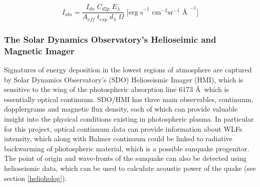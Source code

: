 \begin{equation}\label{irisradiometriccal}
I_{abs} = \frac{{I_{dn}} \; {C_{d2p}} \; {E_{\lambda}}}{{A_{eff}} \; {t_{exp}} \; {d_{\lambda}} \; {\Omega}} \text{ [erg s}^{-1}\text{ cm}^{-2}\text{sr}^{-1}\text{ \AA\ }^{-1}]
\end{equation}



\subsubsection{The Solar Dynamics Observatory's Helioseimic and Magnetic Imager}
Signatures of energy deposition in the lowest regions of atmosphere are captured by Solar Dynamics Observatory's (SDO) Helioseismic Imager (HMI), which is sensitive to the wing of the photospheric absorption line 6173 \AA\, which is essentially optical continuum. SDO/HMI has three main observables, continuum, dopplergrams and magnetic flux density, each of which can provide valuable insight into the physical conditions existing in photospheric plasma. In particular for this project, optical continuum data can provide information about WLFs intensity, which along with Balmer continuum could be linked to radiative backwarming of photospheric material, which is a possible sunquake progenitor. The point of origin and wave-fronts of the sunquake can also be detected using helioseismic data, which can be used to calculate acoustic power of the quake (see section \ref{helioholog}).
